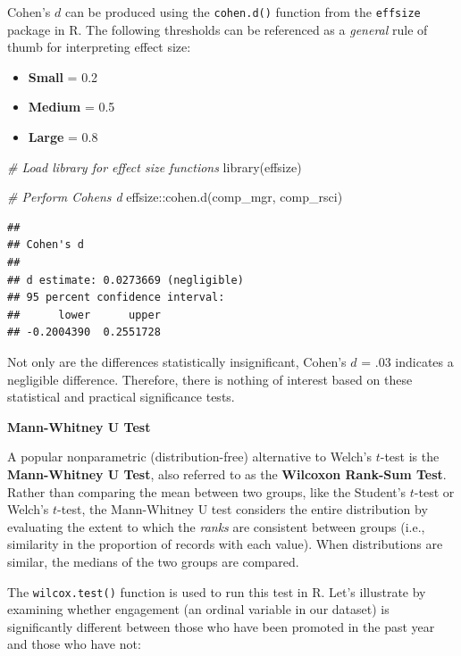 \documentclass[
]{book}
\newenvironment{Shaded}{\begin{snugshade}}{\end{snugshade}}
\newcommand{\CommentTok}[1]{\textcolor[rgb]{0.56,0.35,0.01}{\textit{#1}}}
\newcommand{\FunctionTok}[1]{\textcolor[rgb]{0.00,0.00,0.00}{#1}}
\newcommand{\NormalTok}[1]{#1}
\newcommand{\SpecialCharTok}[1]{\textcolor[rgb]{0.00,0.00,0.00}{#1}}
\providecommand{\tightlist}{%
  \setlength{\itemsep}{0pt}\setlength{\parskip}{0pt}}
\begin{document}
Cohen's \(d\) can be produced using the \texttt{cohen.d()} function from the \texttt{effsize} package in R. The following thresholds can be referenced as a \emph{general} rule of thumb for interpreting effect size:

\begin{itemize}
\tightlist
\item
  \textbf{Small} = 0.2
\item
  \textbf{Medium} = 0.5
\item
  \textbf{Large} = 0.8
\end{itemize}

\begin{Shaded}
\begin{Highlighting}[]
\CommentTok{\# Load library for effect size functions}
\FunctionTok{library}\NormalTok{(effsize)}

\CommentTok{\# Perform Cohen\textquotesingle{}s d}
\NormalTok{effsize}\SpecialCharTok{::}\FunctionTok{cohen.d}\NormalTok{(comp\_mgr, comp\_rsci)}
\end{Highlighting}
\end{Shaded}

\begin{verbatim}
## 
## Cohen's d
## 
## d estimate: 0.0273669 (negligible)
## 95 percent confidence interval:
##      lower      upper 
## -0.2004390  0.2551728
\end{verbatim}

Not only are the differences statistically insignificant, Cohen's \(d\) = .03 indicates a negligible difference. Therefore, there is nothing of interest based on these statistical and practical significance tests.

\textbf{Mann-Whitney U Test}

A popular nonparametric (distribution-free) alternative to Welch's \(t\)-test is the \textbf{Mann-Whitney U Test}, also referred to as the \textbf{Wilcoxon Rank-Sum Test}. Rather than comparing the mean between two groups, like the Student's \(t\)-test or Welch's \(t\)-test, the Mann-Whitney U test considers the entire distribution by evaluating the extent to which the \emph{ranks} are consistent between groups (i.e., similarity in the proportion of records with each value). When distributions are similar, the medians of the two groups are compared.

The \texttt{wilcox.test()} function is used to run this test in R. Let's illustrate by examining whether engagement (an ordinal variable in our dataset) is significantly different between those who have been promoted in the past year and those who have not:
\end{document}
